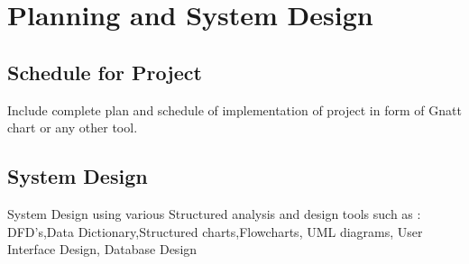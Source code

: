 \chapter{Planning and System Design}


\section{Schedule for Project}
Include complete plan and schedule of implementation of project in form of Gnatt chart or any other tool.

\section{System Design}
System Design using various Structured analysis and design tools such as :
DFD’s,Data Dictionary,Structured charts,Flowcharts, UML diagrams, User Interface Design, Database Design